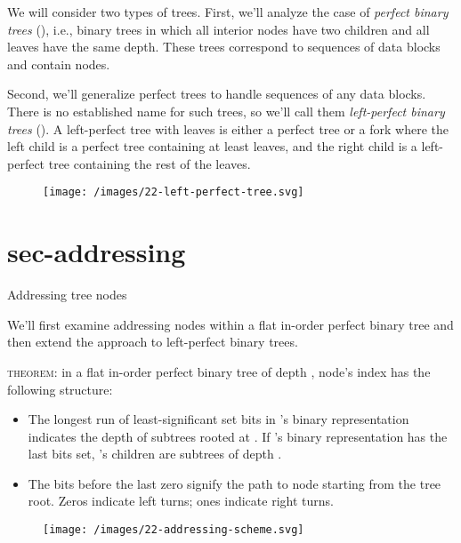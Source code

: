 \documentclass{article}
\begin{document}
We will consider two types of trees.
First, we'll analyze the case of \emph{perfect binary trees} (), i.e., binary trees in which all interior nodes have two children and all leaves have the same depth.
These trees correspond to sequences of  data blocks and contain  nodes.

Second, we'll generalize perfect trees to handle sequences of any  data blocks.
There is no established name for such trees, so we'll call them \emph{left-perfect binary trees} ().
A left-perfect tree with  leaves is either a perfect tree or a fork where the left child is a perfect tree containing at least  leaves, and the right child is a left-perfect tree containing the rest of the leaves.

\begin{figure}[grayscale-diagram,medium-size]
  \texttt{[image: /images/22-left-perfect-tree.svg]}
\end{figure}

\section{sec-addressing}{Addressing tree nodes}

We'll first examine addressing nodes within a flat in-order perfect binary tree and then extend the approach to left-perfect binary trees.

\textsc{theorem}: in a flat in-order perfect binary tree of depth , node's index  has the following structure:
\begin{itemize}
    \item
    The longest run of least-significant set bits in 's binary representation indicates the depth of subtrees rooted at .
    If 's binary representation has the last  bits set, 's children are subtrees of depth .
    \item
    The bits before the last zero signify the path to node  starting from the tree root.
    Zeros indicate left turns; ones indicate right turns.
\end{itemize}

\begin{figure}[grayscale-diagram,medium-size]
  \texttt{[image: /images/22-addressing-scheme.svg]}
\end{figure}
\end{document}
